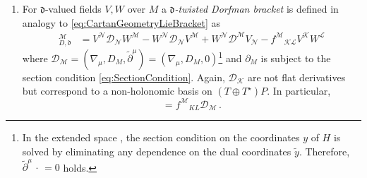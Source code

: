 \documentclass[11pt,a4paper]{article}
\numberwithin{equation}{section}
\begin{document}
\begin{enumerate}
    The non-trivial part of the Cartan connection decomposes into a connection $\Omega_M \in \mathfrak{h}$ on $M$, the generalised frame field ${E_A}^M$ and the field $\rho \in \mathfrak{h} \wedge \mathfrak{h}$. Latter is novel compared to standard Cartan geometry \eqref{eq:CartanConnectionChoice} and the common analysis in generalised geometry or double field theory. It is interpreted as the gauge field that is associated to the freedom of choosing a dual vector space $\mathfrak{h}^\star \subset \mathfrak{d}$ to $\mathfrak{h}$. Due to its first appearance in \cite{Polacek:2013nla}, we call it \textit{Poláček-Siegel field} in the following. In case that $H$ is the double Lorentz group, $\Omega$ can be interpreted as generalised affine connection, as will be demonstrated in section \ref{chap:GeneralisedMetric}.

	\item For $\mathfrak{d}$-valued fields $V,W$ over $M$ a \textit{$\mathfrak{d}$-twisted Dorfman bracket} is defined in analogy to \eqref{eq:CartanGeometryLieBracket} as
	\begin{align}
		 [V,W]_{D,\mathfrak{d}}^{\mathcal{M}} \label{eq:GeneralisedCartanGeometryDorfmannBracket} 
		&= V^{\mathcal{N}} \mathcal{D}_{\mathcal{N}} W^{\mathcal{M}} - W^{\mathcal{N}} \mathcal{D}_{\mathcal{N}} V^{\mathcal{M}} + W^{\mathcal{N}} \mathcal{D}^{\mathcal{M}} V_{\mathcal{N}} - {f^{\mathcal{M}}}_{\mathcal{K}\mathcal{L}} V^{\mathcal{K}} W^{\mathcal{L}}
	\end{align}	 
  where $\mathcal{D}_{\mathcal{M}} = (\nabla_\mu , D_M , \tilde{\partial}^\mu) = (\nabla_\mu , D_M , 0)$\footnote{In the extended space \cite{Butter:2022iza}, the section condition on the coordinates $y$ of $H$ is solved by eliminating any dependence on the dual coordinates $\tilde{y}$. Therefore, $\tilde{\partial}^\mu \, \cdot \, = 0$ holds.} and $\partial_M$ is subject to the section condition \eqref{eq:SectionCondition}. Again, $\mathcal{D}_\mathcal{K}$ are not flat derivatives but correspond to a non-holonomic basis on $(T\oplus T^\star) P$. In particular,
    \begin{equation}
    		[\mathcal{D}_\mathcal{K} , \mathcal{D}_\mathcal{L}] = {f^\mathcal{M}}_{KL} \mathcal{D}_\mathcal{M}\,.
    \end{equation}

\end{enumerate}
\end{document}
